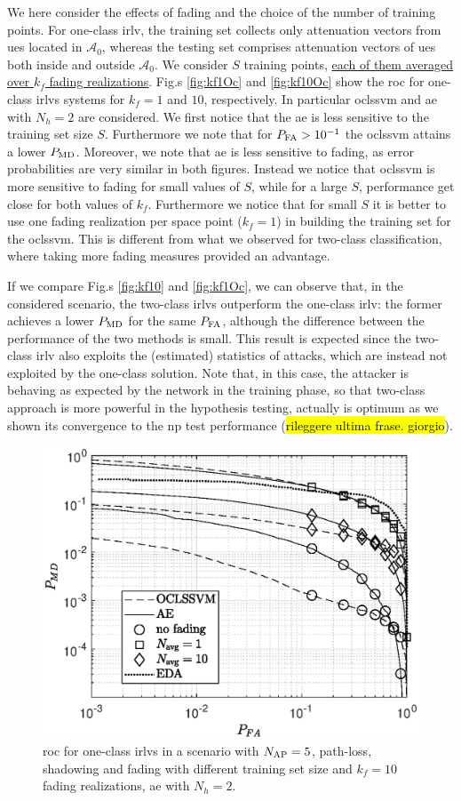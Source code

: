 \documentclass[draftcls,onecolumn,12pt]{IEEEtran}
\begin{document}
We here consider the effects of fading and the choice of the number of training points. For one-class \ac{irlv}, the training set collects only attenuation vectors from \acp{ue} located in $\mathcal{A}_0$, whereas the testing set comprises attenuation vectors of \acp{ue} both inside and outside $\mathcal A_0$. We consider $S$ training points, \underline{each of them averaged over $k_f$ fading realizations}. Fig.s \ref{fig:kf1Oc} and \ref{fig:kf10Oc} show the \ac{roc} for one-class \acp{irlv} systems for $k_f = 1$ and $10$, respectively. In particular \ac{oclssvm} and  \ac{ae} with $N_h=2$ are considered.  We first notice that the \ac{ae} is less sensitive to the training set size $S$. Furthermore we note that for $P_{\rm FA} > 10^{-1}$ the \ac{oclssvm} attains a lower  $P_{\rm MD}$. Moreover, we note that \ac{ae} is less sensitive to fading, as error probabilities are very similar in both figures. Instead we notice that  \ac{oclssvm} is more sensitive to fading for small values of $S$, while for a large $S$, performance get close for both values of $k_f$. Furthermore we notice that for small $S$ it is better to use one fading realization per space point ($k_f=1$) in building the training set for the \ac{oclssvm}. This is different  from what we observed for two-class classification, where taking more fading measures provided an advantage.  

If we compare Fig.s \ref{fig:kf10} and \ref{fig:kf1Oc}, we can observe that, in the considered scenario, the two-class \acp{irlv} outperform the one-class \ac{irlv}: the former achieves a lower $P_{\rm MD}$ for the same $P_{\rm FA}$, although the difference between the performance of the two methods is small. This result is expected since the two-class \ac{irlv} also exploits the (estimated) statistics of attacks, which are instead not exploited by the one-class solution. Note that, in this case, the attacker is behaving as expected by the network in the training phase, so that two-class approach is more powerful in the hypothesis testing, actually is optimum  as we shown its convergence to the \ac{np} test performance (\hl{rileggere ultima frase. giorgio}).
 
 
 
\begin{figure}[t]
    \centering
    \includegraphics[width=0.6\columnwidth]{res_Fading_5BS_oneClass.eps}
    \caption{\ac{roc} for one-class \acp{irlv} in a scenario with $N_{\rm AP}=5$, path-loss, shadowing and fading with different training set size and $k_f=10$ fading realizations,  \ac{ae} with $N_h = 2$. }
    \label{fig:kf10Oc5bs}
\end{figure}
\end{document}
